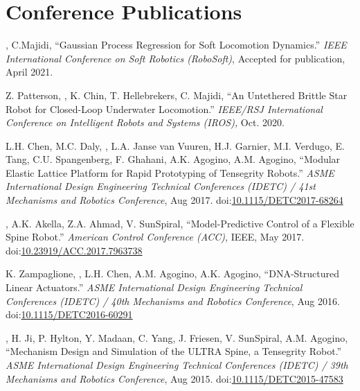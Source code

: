 \documentclass[letterpaper]{deedy-resume} %
\newcommand\doilink[1]{\href{http://dx.doi.org/#1}{#1}}
\newcommand\doi[1]{doi:\doilink{#1}}
\begin{document}
{%

\section{Conference Publications}
\vspace{0.2cm}

\begin{etaremune}[itemsep=0.1cm]

\item \underline{{}}, C.Majidi, ``Gaussian Process Regression for Soft Locomotion Dynamics.'' {\it IEEE International Conference on Soft Robotics (RoboSoft)}, Accepted for publication, April 2021.

\item Z. Patterson, \underline{{}}, K. Chin, T. Hellebrekers, C. Majidi, ``An Untethered Brittle Star Robot for Closed-Loop Underwater Locomotion.'' {\it IEEE/RSJ International Conference on Intelligent Robots and Systems (IROS),} Oct. 2020.

\item L.H. Chen, M.C. Daly, \underline{{}}, L.A. Janse van Vuuren, H.J. Garnier, M.I. Verdugo, E. Tang, C.U. Spangenberg, F. Ghahani, A.K. Agogino, A.M. Agogino, ``Modular Elastic Lattice Platform for Rapid Prototyping of Tensegrity Robots.'' {\it  ASME International Design Engineering Technical Conferences (IDETC) / 41st Mechanisms and Robotics Conference}, Aug 2017. \doi{10.1115/DETC2017-68264}

\item \underline{{}}, A.K. Akella, Z.A. Ahmad, V. SunSpiral, ``Model-Predictive Control of a Flexible Spine Robot.'' {\it American Control Conference (ACC)}, IEEE, May 2017. \doi{10.23919/ACC.2017.7963738}

\item K. Zampaglione, \underline{{}}, L.H. Chen, A.M. Agogino,  A.K. Agogino, ``DNA-Structured Linear Actuators.'' {\it ASME International Design Engineering Technical Conferences (IDETC) / 40th Mechanisms and Robotics Conference}, Aug 2016. \doi{10.1115/DETC2016-60291}
  
\item \underline{{}}, H. Ji, P. Hylton, Y. Madaan, C. Yang, J. Friesen, V. SunSpiral, A.M. Agogino, ``Mechanism Design and Simulation of the ULTRA Spine, a Tensegrity Robot.'' {\it ASME International Design Engineering Technical Conferences (IDETC) / 39th Mechanisms and Robotics Conference}, Aug 2015. \doi{10.1115/DETC2015-47583}


\end{etaremune}}
\end{document}
